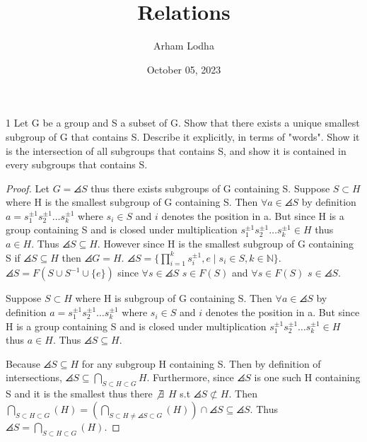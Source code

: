 \documentclass{article}
\newcommand{\N}{\mathbb{N}}
\begin{document}
\title{Relations}
\author{Arham Lodha}%
\date{October 05, 2023}%
\maketitle

\begin{PROB}{1}\label{Problem 1.}
    Let G be a group and S a subset of G. Show that there exists a unique smallest subgroup of G that contains S.  Describe it explicitly, in terms of "words". Show it is the intersection of all subgroups that contains S, and show it is contained in every subgroups that contains S.
\end{PROB}
\begin{proof}
    Let $G = \angles{S}$ thus there exists subgroups of G containing S. Suppose $S \subset H$ where H is the smallest subgroup of G containing S. Then $\forall a \in \angles{S}$ by definition $a = s_1^{\pm 1}s_2^{\pm 1}\ldots s_k^{\pm 1}$ where $s_i \in S$ and $i$ denotes the position in a. But since H is a group containing S and is closed under multiplication $s_1^{\pm 1}s_2^{\pm 1}\ldots s_k^{\pm 1} \in H$ thus $a \in H$. Thus $\angles{S} \subseteq H$. However since H is the smallest subgroup of G containing S if $\angles{S} \subseteq H$ then $\angles{G} = H$. $\angles{S} = \{\prod_{i = 1}^k s_i^{\pm 1}, e \mid s_i \in S, k \in \N\}$. $\angles{S} = F(S \cup S^{-1} \cup \{e\})$ since $\forall s \in \angles{S}$ $s \in F(S)$ and $\forall s \in F(S)$ $s \in \angles{S}$.

    Suppose $S \subset H$ where H is subgroup of G containing S. Then $\forall a \in \angles{S}$ by definition $a = s_1^{\pm 1}s_2^{\pm 1}\ldots s_k^{\pm 1}$ where $s_i \in S$ and $i$ denotes the position in a. But since H is a group containing S and is closed under multiplication $s_1^{\pm 1}s_2^{\pm 1}\ldots s_k^{\pm 1} \in H$ thus $a \in H$. Thus $\angles{S} \subseteq H$.

    Because $\angles{S} \subseteq H$ for any subgroup H containing S. Then by definition of intersections, $\angles{S} \subseteq \bigcap_{S \subset H \subset G}H$. Furthermore, since $\angles{S}$ is one such H containing S and it is the smallest thus there $\not \exists$ $H$ s.t $\angles{S} \not \subset H$. Then $\bigcap_{S \subset H \subset G} (H) = (\bigcap_{S \subset H \neq \angles{S} \subset G} (H)) \cap \angles{S} \subseteq \angles{S}$. Thus $\angles{S} = \bigcap_{S \subset H \subset G} (H)$.
\end{proof}
\end{document}

